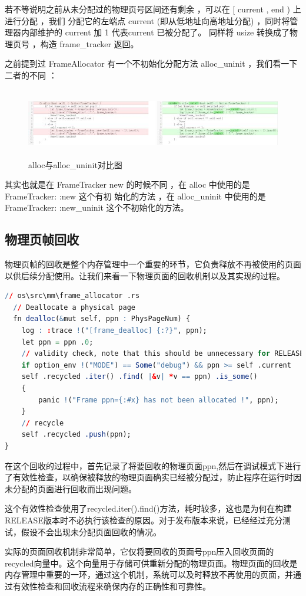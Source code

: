 	若不等说明之前从未分配过的物理页号区间还有剩余 ，可以在 [  current ,  end ) 上进行分配 ，我们 分配它的左端点  current  (即从低地址向高地址分配)  ，同时将管理器内部维护的  current 加  1 代表current 已被分配了。  同样将  usize 转换成了物理页号 ，构造 frame\_tracker 返回。
	
	之前提到过 FrameAllocator 有⼀个不初始化分配方法 alloc\_uninit ，我们看一下二者的不同 ：
	\begin{figure}[h]
	  \centering
	  \includegraphics[width=14cm,height=3cm]{figures/04-03-alloc与alloc_uninit对比图.png}
	  \caption{alloc与alloc\_uninit对比图}
	\end{figure}
	
	其实也就是在 FrameTracker  new 的时候不同 ，在 alloc 中使用的是 FrameTracker: :new 这个有初 始化的方法 ，在 alloc\_uninit 中使用的是 FrameTracker: :new\_uninit 这个不初始化的方法。
	\subsection{物理页帧回收}
	物理页帧的回收是整个内存管理中一个重要的环节，它负责释放不再被使用的页面以供后续分配使用。让我们来看一下物理页面的回收机制以及其实现的过程。
	
\begin{lstlisting}[language=R]
  // os\src\mm\frame_allocator .rs
  // Deallocate a physical page
  fn dealloc(&mut self, ppn : PhysPageNum) {
    log : :trace !("[frame_dealloc] {:?}", ppn);
    let ppn = ppn .0;
    // validity check, note that this should be unnecessary for RELEASE build and it
    if option_env !("MODE") == Some("debug") && ppn >= self .current
    self .recycled .iter() .find( |&v| *v == ppn) .is_some()
    {
    	panic !("Frame ppn={:#x} has not been allocated !", ppn);
    }
    // recycle
    self .recycled .push(ppn);
}
\end{lstlisting}
  
  在这个回收的过程中，首先记录了将要回收的物理页面ppn,然后在调试模式下进行了有效性检查，以确保被释放的物理页面确实已经被分配过，防止程序在运行时因未分配的页面进行回收而出现问题。
  
  这个有效性检查使用了recycled.iter().find()方法，耗时较多，这也是为何在构建RELEASE版本时不必执行该检查的原因。对于发布版本来说，已经经过充分测试，假设不会出现未分配页面回收的情况。
  
  实际的页面回收机制非常简单，它仅将要回收的页面号ppn压入回收页面的recycled向量中。这个向量用于存储可供重新分配的物理页面。物理页面的回收是内存管理中重要的一环，通过这个机制，系统可以及时释放不再使用的页面，并通过有效性检查和回收流程来确保内存的正确性和可靠性。
%
